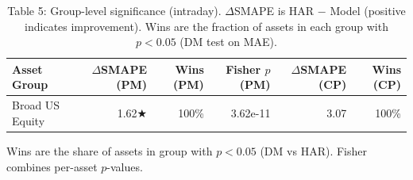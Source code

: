 \begin{table}[t]
\centering
\caption{Table 5: Group-level significance (intraday). $\Delta$SMAPE is HAR $-$ Model (positive indicates improvement). Wins are the fraction of assets in each group with $p<0.05$ (DM test on MAE).}
\label{tab:groups}
\begin{tabular}{l r r r r r}
\toprule
Asset Group & $\Delta$SMAPE (PM) & Wins (PM) & Fisher $p$ (PM) & $\Delta$SMAPE (CP) & Wins (CP) \\
\midrule
Broad US Equity & 1.62★ & 100\% & 3.62e-11 & 3.07 & 100\% \\
\bottomrule
\end{tabular}
\vspace{2pt}
\footnotesize{Wins are the share of assets in group with $p<0.05$ (DM vs HAR). Fisher combines per-asset $p$-values.}
\end{table}